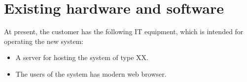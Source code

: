 \documentclass[Main]{subfiles}
\begin{document}
\section{Existing hardware and software}
At present, the customer has the following IT equipment, which is intended for operating the new system:

\begin{itemize}
\item A server for hosting the system of type XX. %
\item The users of the system has modern web browser.
\end{itemize}
\end{document}
